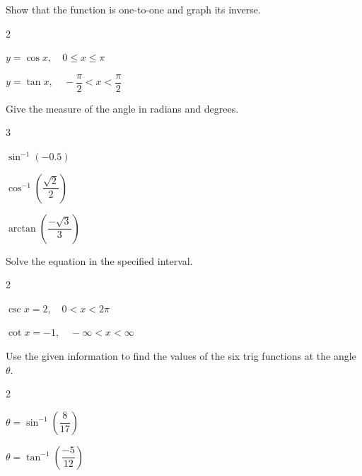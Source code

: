 \documentclass[11pt]{article}
\begin{document}
\begin{enumerate}
        \newpage

        \noindent Show that the function is one-to-one and graph its inverse.

        \begin{multicols}{2}
            \item $\displaystyle y = \cos x,\quad 0 \le x \le \pi$\\[1ex]\smallgraph
            \item $\displaystyle y = \tan x,\quad -\dfrac{\pi}{2} < x < \dfrac{\pi}{2}$\\[1ex]\smallgraph
        \end{multicols}

        \vspace{1ex}

        \noindent Give the measure of the angle in radians and degrees.

        \begin{multicols}{3}
            \item $\displaystyle \sin^{-1}(-0.5)$\\[5ex]
            \item $\displaystyle \cos^{-1}\!\left(\dfrac{\sqrt{2}}{2}\right)$\\[5ex]
            \item $\displaystyle \arctan\!\left(\dfrac{-\sqrt{3}}{3}\right)$\\[5ex]
        \end{multicols}

        \noindent Solve the equation in the specified interval.

        \begin{multicols}{2}
            \item $\displaystyle \csc x = 2,\quad 0 < x < 2\pi$\\[5ex]
            \item $\displaystyle \cot x = -1,\quad -\infty < x < \infty$\\[5ex]
        \end{multicols}

        \noindent Use the given information to find the values of the six trig functions at the angle $\theta$.

        \begin{multicols}{2}
            \item $\displaystyle \theta = \sin^{-1}\!\left(\dfrac{8}{17}\right)$\\[6ex]
            \item $\displaystyle \theta = \tan^{-1}\!\left(\dfrac{-5}{12}\right)$\\[6ex]
        \end{multicols}


\end{enumerate}
\end{document}
